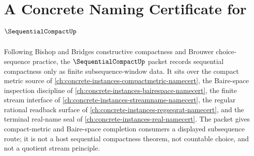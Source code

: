 \chapter{A Concrete Naming Certificate for $\SequentialCompactUp$}
\label{ch:concrete-instances-sequentialcompact-namecert}

Following Bishop and Bridges constructive compactness and Brouwer choice-sequence practice, the $\SequentialCompactUp$ packet records sequential compactness only as finite subsequence-window data. It sits over the compact metric source of \autoref{ch:concrete-instances-compactmetric-namecert}, the Baire-space inspection discipline of \autoref{ch:concrete-instances-bairespace-namecert}, the finite stream interface of \autoref{ch:concrete-instances-streamname-namecert}, the regular rational readback surface of \autoref{ch:concrete-instances-regseqrat-namecert}, and the terminal real-name seal of \autoref{ch:concrete-instances-real-namecert}. The packet gives compact-metric and Baire-space completion consumers a displayed subsequence route; it is not a host sequential compactness theorem, not countable choice, and not a quotient stream principle.

